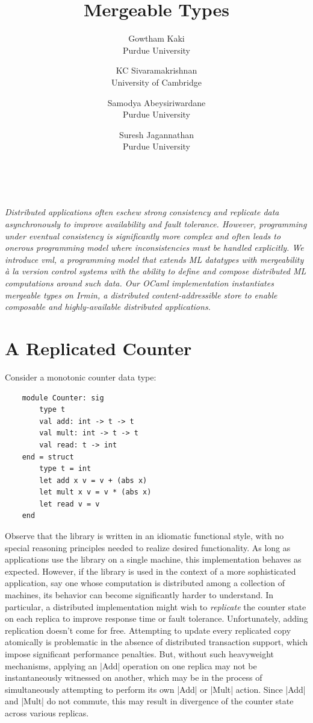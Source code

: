 \documentclass[twocolumn,9pt]{extarticle}
\title{{\bf Mergeable Types}}
\author{Gowtham Kaki \\
        Purdue University
        \and
				KC Sivaramakrishnan \\
        University of Cambridge
				\and
				Samodya Abeysiriwardane \\
				Purdue University\\
                                \and
                              	Suresh Jagannathan \\
				Purdue University}
\date{~}
\newcommand{\name}{{\sc vml}\xspace}
\begin{document}
\maketitle

\emph{
	Distributed applications often eschew strong consistency and replicate data
	asynchronously to improve availability and fault tolerance. However,
	programming under eventual consistency is significantly more complex and
	often leads to onerous programming model where inconsistencies must be
	handled explicitly. We introduce \name, a programming model that extends ML
	datatypes with mergeability \`{a} la version control systems with the ability
	to define and compose distributed ML computations around such data. Our OCaml
	implementation instantiates mergeable types on Irmin, a distributed
	content-addressible store to enable composable and highly-available
	distributed applications.
}

\section{A Replicated Counter}

Consider a monotonic counter data type:

\begin{lstlisting}
	module Counter: sig
		type t
		val add: int -> t -> t
		val mult: int -> t -> t
		val read: t -> int
	end = struct
		type t = int
		let add x v = v + (abs x)
		let mult x v = v * (abs x)
		let read v = v
	end
\end{lstlisting}

Observe that the library is written in an idiomatic functional style, with no
special reasoning principles needed to realize desired functionality. As long
as applications use the library on a single machine, this implementation
behaves as expected.  However, if the library is used in the context of a more
sophisticated application, say one whose computation is distributed among a
collection of machines, its behavior can become significantly harder to
understand.  In particular, a distributed implementation might wish to
\emph{replicate} the counter state on each replica to improve response time or
fault tolerance.  Unfortunately, adding replication doesn't come for free.
Attempting to update every replicated copy atomically is problematic in the
absence of distributed transaction support, which impose significant
performance penalties.  But, without such heavyweight mechanisms, applying an
|Add| operation on one replica may not be instantaneously witnessed on another,
which may be in the process of simultaneously attempting to perform
its own |Add| or |Mult| action. Since |Add| and |Mult| do not commute,
this may result in divergence of the counter state across various replicas.
\end{document}
